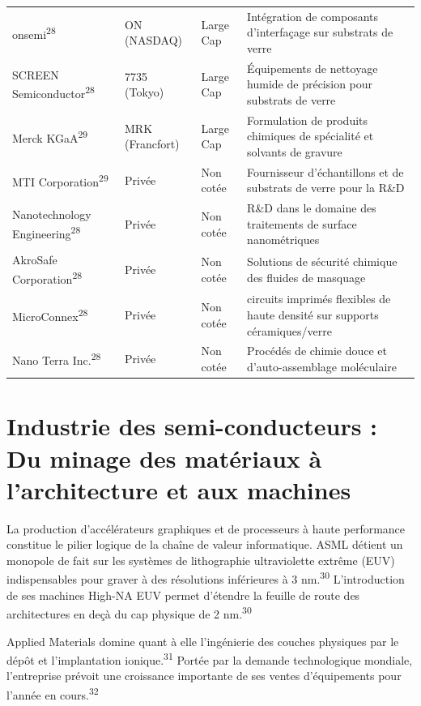 \documentclass[11pt,a4paper]{article}
\begin{document}
\begin{longtable}{p{3cm} p{3.5cm} p{3cm} p{5cm}}
onsemi\textsuperscript{28} & ON (NASDAQ) & Large Cap & Intégration de composants d'interfaçage sur substrats de verre \\
SCREEN Semiconductor\textsuperscript{28} & 7735 (Tokyo) & Large Cap & Équipements de nettoyage humide de précision pour substrats de verre \\
Merck KGaA\textsuperscript{29} & MRK (Francfort) & Large Cap & Formulation de produits chimiques de spécialité et solvants de gravure \\
MTI Corporation\textsuperscript{29} & Privée & Non cotée & Fournisseur d'échantillons et de substrats de verre pour la R\&D \\
Nanotechnology Engineering\textsuperscript{28} & Privée & Non cotée & R\&D dans le domaine des traitements de surface nanométriques \\
AkroSafe Corporation\textsuperscript{28} & Privée & Non cotée & Solutions de sécurité chimique des fluides de masquage \\
MicroConnex\textsuperscript{28} & Privée & Non cotée & circuits imprimés flexibles de haute densité sur supports céramiques/verre \\
Nano Terra Inc.\textsuperscript{28} & Privée & Non cotée & Procédés de chimie douce et d'auto-assemblage moléculaire \\
\bottomrule
\end{longtable}

\section*{Industrie des semi-conducteurs : Du minage des matériaux à l'architecture et aux machines}

La production d'accélérateurs graphiques et de processeurs à haute performance constitue le pilier logique de la chaîne de valeur informatique. ASML détient un monopole de fait sur les systèmes de lithographie ultraviolette extrême (EUV) indispensables pour graver à des résolutions inférieures à 3 nm.\textsuperscript{30} L'introduction de ses machines High-NA EUV permet d'étendre la feuille de route des architectures en deçà du cap physique de 2 nm.\textsuperscript{30}

Applied Materials domine quant à elle l'ingénierie des couches physiques par le dépôt et l'implantation ionique.\textsuperscript{31} Portée par la demande technologique mondiale, l'entreprise prévoit une croissance importante de ses ventes d'équipements pour l'année en cours.\textsuperscript{32}
\end{document}
